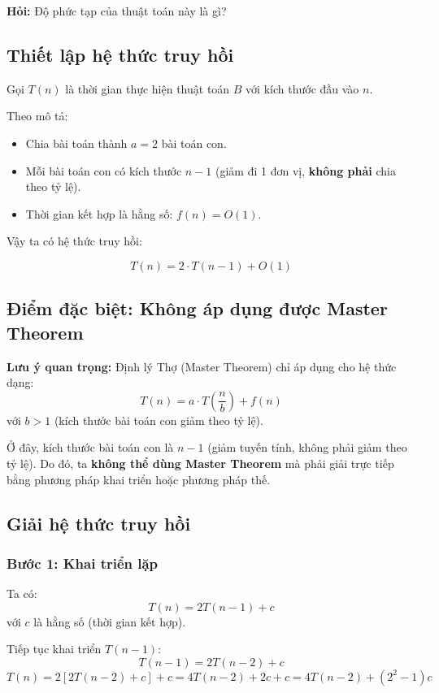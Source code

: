 \documentclass{article}
\begin{document}
\textbf{Hỏi:} Độ phức tạp của thuật toán này là gì?

\subsection{Thiết lập hệ thức truy hồi}

Gọi \(T(n)\) là thời gian thực hiện thuật toán \(B\) với kích thước đầu vào \(n\).

Theo mô tả:
\begin{itemize}
    \item Chia bài toán thành \(a = 2\) bài toán con.
    \item Mỗi bài toán con có kích thước \(n - 1\) (giảm đi 1 đơn vị, \textbf{không phải} chia theo tỷ lệ).
    \item Thời gian kết hợp là hằng số: \(f(n) = O(1)\).
\end{itemize}

Vậy ta có hệ thức truy hồi:

\[
\boxed{T(n) = 2 \cdot T(n - 1) + O(1)}
\]

\subsection{Điểm đặc biệt: Không áp dụng được Master Theorem}

\textbf{Lưu ý quan trọng:} 
Định lý Thợ (Master Theorem) chỉ áp dụng cho hệ thức dạng:
\[
T(n) = a \cdot T\left(\frac{n}{b}\right) + f(n)
\]
với \(b > 1\) (kích thước bài toán con giảm theo tỷ lệ).

Ở đây, kích thước bài toán con là \(n - 1\) (giảm tuyến tính, không phải giảm theo tỷ lệ). Do đó, ta \textbf{không thể dùng Master Theorem} mà phải giải trực tiếp bằng phương pháp khai triển hoặc phương pháp thế.

\subsection{Giải hệ thức truy hồi}

\subsubsection{Bước 1: Khai triển lặp}

Ta có:
\[
T(n) = 2T(n-1) + c
\]
với \(c\) là hằng số (thời gian kết hợp).

Tiếp tục khai triển \(T(n-1)\):
\[
T(n-1) = 2T(n-2) + c
\]
\[
T(n) = 2[2T(n-2) + c] + c = 4T(n-2) + 2c + c = 4T(n-2) + (2^2 - 1)c
\]
\end{document}
